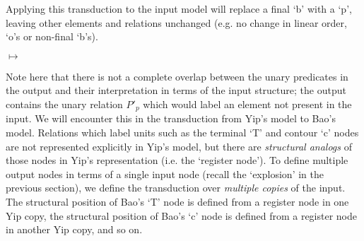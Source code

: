 \documentclass{article}
\begin{document}
Applying this transduction to the input model will replace a final `b' with a `p', leaving other elements and relations unchanged (e.g. no change in linear order, `o's or non-final `b's).
\begin{center}
\hspace{.5cm}
$\mapsto$
\hspace{.5cm}
\end{center}
Note here that there is not a complete overlap between the unary predicates in the output and their interpretation in terms of the input structure; the output contains the unary relation $P'_{p}$ which would label an element not present in the input. We will encounter this in the transduction from Yip's model to Bao's model. Relations which label units such as the terminal `T' and contour `c' nodes are not represented explicitly in Yip's model, but there are \emph{structural analogs} of those nodes in Yip's representation (i.e. the `register node'). To define multiple output nodes in terms of a single input node (recall the `explosion' in the previous section), we define the transduction over \emph{multiple copies} of the input. The structural position of Bao's `T' node is defined from a register node in one Yip copy, the structural position of Bao's `c' node is defined from a register node in another Yip copy, and so on. \par
\end{document}
